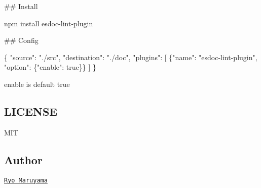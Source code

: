 \#\# Install 
\begin{DoxyCode}
npm install esdoc-lint-plugin
\end{DoxyCode}


\#\# Config 
\begin{DoxyCode}
\{
  "source": "./src",
  "destination": "./doc",
  "plugins": [
    \{"name": "esdoc-lint-plugin", "option": \{"enable": true\}\}
  ]
\}
\end{DoxyCode}


{\ttfamily enable} is default {\ttfamily true}

\subsection*{L\+I\+C\+E\+N\+SE}

M\+IT

\subsection*{Author}

\href{https://github.com/h13i32maru}{\tt Ryo Maruyama} 